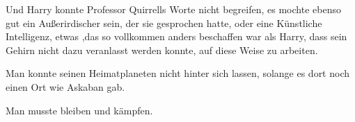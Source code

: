 Und Harry konnte Professor Quirrells Worte nicht begreifen, es mochte ebenso gut ein Außerirdischer sein, der sie gesprochen hatte, oder eine Künstliche Intelligenz, etwas ,das so vollkommen anders beschaffen war als Harry, dass sein Gehirn nicht dazu veranlasst werden konnte, auf diese Weise zu arbeiten.

Man konnte seinen Heimatplaneten nicht hinter sich lassen, solange es dort noch einen Ort wie Askaban gab.

Man musste bleiben und kämpfen.

